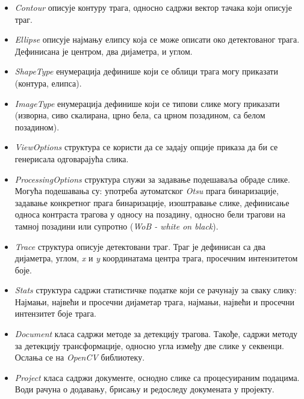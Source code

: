 \documentclass[12pt,a4paper,serbian,oneside]{book}
\begin{document}
\begin{itemize}
  \item \textit{Contour} описује контуру трага, односно садржи вектор тачака који описује траг.
  \item \textit{Ellipse} описује најмању елипсу која се може описати око детектованог трага. Дефинисана је центром, два дијаметра, и углом.
  \item \textit{ShapeType} енумерација дефинише који се облици трага могу приказати (контура, елипса).
  \item \textit{ImageType} енумерација дефинише који се типови слике могу приказати (изворна, сиво скалирана, црно бела, са црном позадином, са белом позадином).
  \item \textit{ViewOptions} структура се користи да се задају опције приказа да би се генерисала одговарајућа слика. 
  \item \textit{ProcessingOptions} структура служи за задавање подешаваља обраде слике. Могућа подешавања су: употреба аутоматског \textit{Otsu} прага бинаризације, задавање конкретног прага бинаризације, изоштравање слике, дефинисање односа контраста трагова у односу на позадину, односно бели трагови на тамној позадини или супротно (\textit{WoB - white on black}).
  \item \textit{Trace} структура описује детектовани траг. Траг је дефинисан са два дијаметра, углом, \textit{x} и \textit{y} координатама центра трага, просечним интензитетом боје.
  \item \textit{Stats} структура садржи статистичке податке који се рачунају за сваку слику: Најмањи, највећи и просечни дијаметар трага, најмањи, највећи и просечни интензитет боје трага.
  \item \textit{Document} класа садржи методе за детекцију трагова. Такође, садржи методу за детекцију трансформације, односно угла између две слике у секвенци. Ослања се на \textit{OpenCV} библиотеку.
  \item \textit{Project} класа садржи документе, оснодно слике са процесуираним подацима. Води рачуна о додавању, брисању и  редоследу докумената у пројекту.
\end{itemize}
\end{document}
